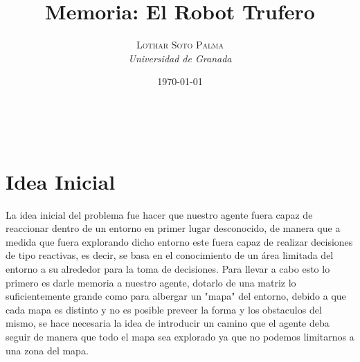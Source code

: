 \documentclass[a4paper, 11pt]{article} %
\title{Memoria: El Robot Trufero}
\author{\textsc{Lothar Soto Palma} %
\\{\textit{Universidad de Granada}}} %
\date{\today} %
\makeatletter
\renewcommand{\maketitle}{ %
\begin{center} %
{\Huge\@title} %
\end{center}

\vspace{20pt} %

\begin{flushright} %
{\large\@author} %
\\\@date %

\vspace{40pt} %
\end{flushright}
}
\makeatother
\begin{document}
\maketitle
\section{Idea Inicial}
La idea inicial del problema fue hacer que nuestro agente fuera capaz de reaccionar dentro de un entorno en primer lugar desconocido, de manera que a medida que fuera explorando dicho entorno este fuera capaz de realizar decisiones de tipo reactivas, es decir, se basa en el conocimiento de un área limitada del entorno a su alrededor para la toma de decisiones. Para llevar a cabo esto lo primero es darle memoria a nuestro agente, dotarlo de una matriz lo suficientemente grande como para albergar un "mapa" del entorno, debido a que cada mapa es distinto y no es posible preveer la forma y los obstaculos del mismo, se hace necesaria la idea de introducir un camino que el agente deba seguir de manera que todo el mapa sea explorado ya que no podemos limitarnos a una zona del mapa.
\end{document}
